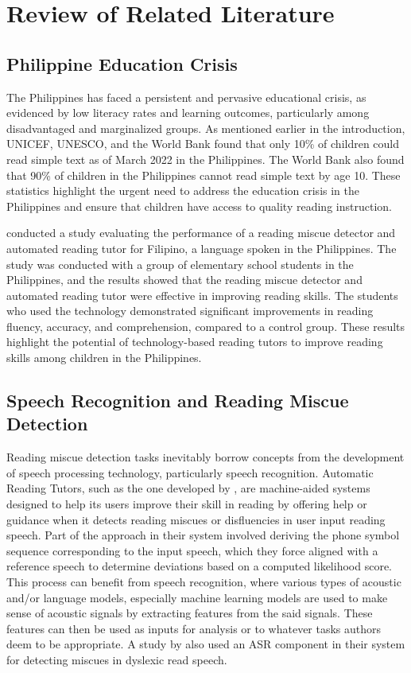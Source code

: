 \chapter{Review of Related Literature}
\label{sec:relatedlit}

\section{Philippine Education Crisis}
The Philippines has faced a persistent and pervasive educational crisis, as evidenced by low literacy rates and learning outcomes, particularly among disadvantaged and marginalized groups. As mentioned earlier in the introduction, UNICEF, UNESCO, and the World Bank found that only 10\% of children could read simple text as of March 2022 in the Philippines. The World Bank also found that 90\% of children in the Philippines cannot read simple text by age 10. These statistics highlight the urgent need to address the education crisis in the Philippines and ensure that children have access to quality reading instruction.

\citeauthor{pascual-2017} \citeyear{pascual-2017} conducted a study evaluating the performance of a reading miscue detector and automated reading tutor for Filipino, a language spoken in the Philippines. The study was conducted with a group of elementary school students in the Philippines, and the results showed that the reading miscue detector and automated reading tutor were effective in improving reading skills. The students who used the technology demonstrated significant improvements in reading fluency, accuracy, and comprehension, compared to a control group. These results highlight the potential of technology-based reading tutors to improve reading skills among children in the Philippines.


\section{Speech Recognition and Reading Miscue Detection}
Reading miscue detection tasks inevitably borrow concepts from the development of speech processing technology, particularly speech recognition. Automatic Reading Tutors, such as the one developed by \citeauthor{pascual-2017} \citeyear{pascual-2017}, are machine-aided systems designed to help its users improve their skill in reading by offering help or guidance when it detects reading miscues or disfluencies in user input reading speech. Part of the approach in their system involved deriving the phone symbol sequence corresponding to the input speech, which they force aligned with a reference speech to determine deviations based on a computed likelihood score. This process can benefit from speech recognition, where various types of acoustic and/or language models, especially machine learning models are used to make sense of acoustic signals by extracting features from the said signals. These features can then be used as inputs for analysis or to whatever tasks authors deem to be appropriate. A study by \citeauthor{rasmussen-2009} \citeyear{rasmussen-2009} also used an ASR component in their system for detecting miscues in dyslexic read speech.

